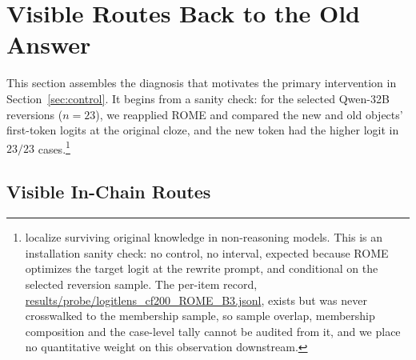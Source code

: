 \documentclass[letterpaper]{article} %
\begin{document}
\section{Visible Routes Back to the Old Answer}
\label{sec:diagnosis}

This section assembles the diagnosis that motivates the primary intervention in Section~\ref{sec:control}.  It begins from a sanity check: for the selected Qwen-32B reversions (\(n=23\)), we reapplied ROME and compared the new and old objects' first-token logits at the original cloze, and the new token had the higher logit in \(23/23\) cases.\footnote{\citet{xie2025superficial} localize surviving original knowledge in non-reasoning models.  This is an installation sanity check: no control, no interval, expected because ROME optimizes the target logit at the rewrite prompt, and conditional on the selected reversion sample.  The per-item record, \url{results/probe/logitlens_cf200_ROME_B3.jsonl}, exists but was never crosswalked to the membership sample, so sample overlap, membership composition and the case-level tally cannot be audited from it, and we place no quantitative weight on this observation downstream.} %

\subsection{Visible In-Chain Routes}
\label{sec:diagnosis-routes}
\end{document}
